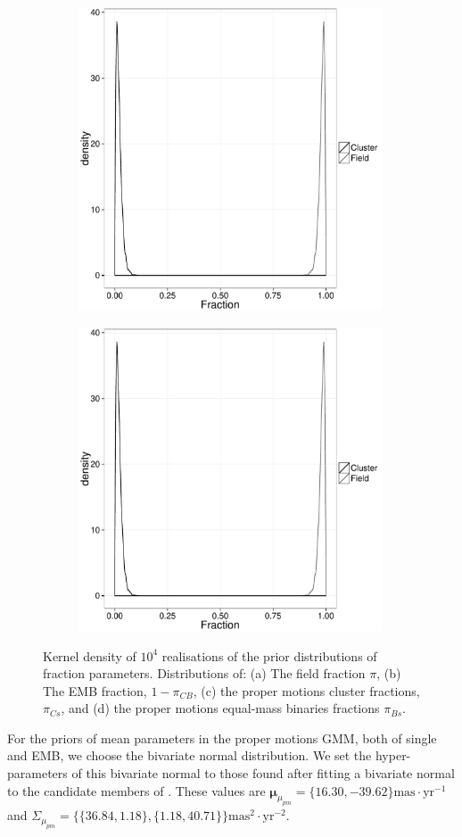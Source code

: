 \begin{figure}[ht!]
\begin{subfigure}[t]{0.48\textwidth}
      \includegraphics[page=3,height=9cm,width=\textwidth]{background/Figures/Priors.pdf}
        \caption{}
        \label{} 
    \end{subfigure}
     \begin{subfigure}[t]{0.48\textwidth}
      \includegraphics[page=4,height=9cm,width=\textwidth]{background/Figures/Priors.pdf}
        \caption{}
        \label{} 
    \end{subfigure}
\caption{Kernel density of $10^4$ realisations of the prior distributions of fraction parameters. Distributions of: (a) The field fraction $\pi$, (b) The EMB fraction, $1-\pi_{CB}$, (c) the proper motions cluster fractions, $\pi_{Cs}$, and (d) the proper motions equal-mass binaries fractions $\pi_{Bs}$.}
\label{figure:priors}
\end{figure}

For the priors of mean parameters in the proper motions GMM, both of single and EMB, we choose the bivariate normal distribution. We set the hyper-parameters of this bivariate normal to those found after fitting a bivariate normal to the candidate members of \citet{Bouy2015}. These values are $\boldsymbol{\mu}_{\mu_{pm}}=\{16.30,-39.62\}\mathrm{mas\cdot yr^{-1}}$ and $\Sigma_{\mu_{pm}}=\{\{36.84,1.18\},\{1.18,40.71\}\}\mathrm{mas^2\cdot yr^{-2}}$. 

